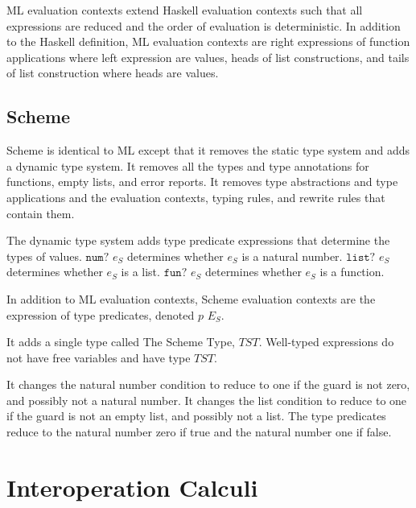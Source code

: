 ML evaluation contexts extend Haskell evaluation contexts such that all expressions are reduced and the order of evaluation is deterministic.  In addition to the Haskell definition, ML evaluation contexts are right expressions of function applications where left expression are values, heads of list constructions, and tails of list construction where heads are values.

\subsection{Scheme}

Scheme is identical to ML except that it removes the static type system and adds a dynamic type system.  It removes all the types and type annotations for functions, empty lists, and error reports.  It removes type abstractions and type applications and the evaluation contexts, typing rules, and rewrite rules that contain them.

The dynamic type system adds type predicate expressions that determine the types of values.  $\mathtt{num?}$ $e_{S}$ determines whether $e_{S}$ is a natural number.  $\mathtt{list?}$ $e_{S}$ determines whether $e_{S}$ is a list.  $\mathtt{fun?}$ $e_{S}$ determines whether $e_{S}$ is a function.

In addition to ML evaluation contexts, Scheme evaluation contexts are the expression of type predicates, denoted $p$ $E_{S}$.

It adds a single type called The Scheme Type, $TST$.  Well-typed expressions do not have free variables and have type $TST$.

It changes the natural number condition to reduce to one if the guard is not zero, and possibly not a natural number.  It changes the list condition to reduce to one if the guard is not an empty list, and possibly not a list.  The type predicates reduce to the natural number zero if true and the natural number one if false.











\section{Interoperation Calculi}

